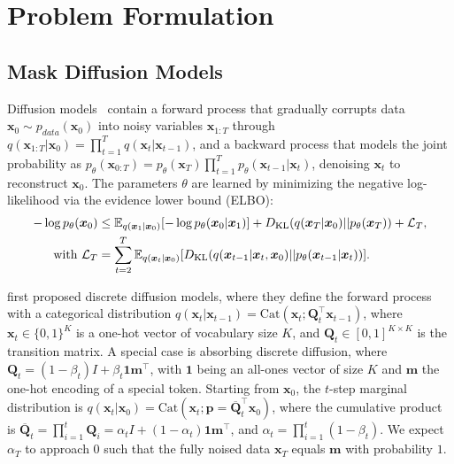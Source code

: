 \section{Problem Formulation}
\subsection{Mask Diffusion Models}
Diffusion models~\citep{ho2020denoising,song2021scorebased} contain a forward process that gradually corrupts data $\bm{x}_0\sim p_{data}(\bm{x}_0)$ into noisy variables $\bm{x}_{1:T}$ through $q(\bm{x}_{1:T}|\bm{x}_0)=\prod_{t=1}^{T}q(\bm{x}_t|\bm{x}_{t-1})$, and a backward process that models the joint probability as $p_{\theta}(\bm{x}_{0:T})=p_{\theta}(\bm{x}_T)\prod_{t=1}^Tp_{\theta}(\bm{x}_{t-1}|\bm{x}_t)$, denoising $\bm{x}_t$ to reconstruct $\bm{x}_0$. The parameters $\theta$ are learned by minimizing the negative log-likelihood via the evidence lower bound (ELBO):
\begin{align}
\label{eq:ori-loss-appen}
    -\log p_{\theta}(\bm{x}_0) & \leq \mathbb{E}_{q(\bm{x}_1|\bm{x}_0)}[-\log p_{\theta}(\bm{x}_0|\bm{x}_1)] + D_{\mathrm{KL}}(q(\bm{x}_T|\bm{x}_0)||p_{\theta}(\bm{x}_T))+\mathcal{L}_T, \\
    \label{eq:ori-loss-line2-appen}
    \text{with }
\mathcal{L}_T & =\sum_{t=2}^T\mathbb{E}_{q(\bm{x}_t|\bm{x}_0)}[D_{\mathrm{KL}}(q(\bm{x}_{t-1}|\bm{x}_t, \bm{x}_0)||p_{\theta}(\bm{x}_{t-1}|\bm{x}_t))].
\end{align}

\citet{hoogeboom2021argmax,austin2021structured} first proposed discrete diffusion models, where they define the forward process with a categorical distribution $q(\bm{x}_{t} \vert \bm{x}_{t-1})=\text{Cat}(\bm{x}_t;\bm{Q}_t^\top\bm{x}_{t-1})$, where $\bm{x}_t \in \{0, 1\}^K$ is a one-hot vector of vocabulary size $K$, and $\bm{Q}_t\in[0,1]^{K\times K}$ is the transition matrix. A special case is absorbing discrete diffusion, where $\bm{Q}_t=(1-\beta_t)I+\beta_t\mathbf{1}\bm{m}^\top$, with $\mathbf{1}$ being an all-ones vector of size $K$ and $\bm{m}$ the one-hot encoding of a special \mask token.
Starting from $\bm{x}_0$, the $t$-step marginal distribution is $q(\bm{x}_t|\bm{x}_0)=\text{Cat}(\bm{x}_t;\bm{p}=\bm{\overline{Q}}_t^\top\bm{x}_0)$, where the cumulative product is $\bm{\overline{Q}}_t = \prod_{i=1}^t\bm{Q}_i=\alpha_tI+(1-\alpha_t)\mathbf{1}\bm{m}^\top$, and $\alpha_t=\prod_{i=1}^t(1-\beta_t)$. We expect $\alpha_T$ to approach $0$ such that the fully noised data $\bm{x}_T$ equals $\bm{m}$ with probability $1$.

